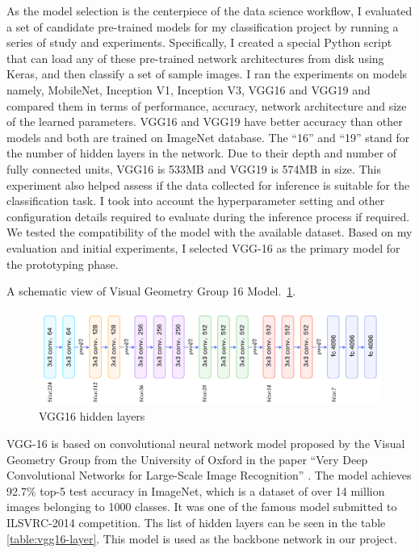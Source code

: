 As the model selection is the centerpiece of the data science workflow, I evaluated a set of candidate pre-trained models for my classification project by running a series of study and experiments. Specifically, I created a special Python script that can load any of these pre-trained network architectures from disk using Keras, and then classify a set of sample images. I ran the experiments on models namely, MobileNet, Inception V1, Inception V3, VGG16 and VGG19 and compared them in terms of performance, accuracy, network architecture and size of the learned parameters. VGG16 and VGG19 have better accuracy than other models and both are trained on ImageNet database. The “16” and “19” stand for the number of hidden layers in the network. Due to their depth and number of fully connected units, VGG16 is 533MB and VGG19 is 574MB in size. This experiment also helped assess if the data collected for inference is suitable for the classification task. I took into account the hyperparameter setting and other configuration details required to evaluate during the inference process if required. We tested the compatibility of the model with the available dataset. Based on my evaluation and initial experiments, I selected VGG-16 as the primary model for the prototyping phase.

A schematic view of Visual Geometry Group 16 Model.~\ref{fig:CNN-1}.
\begin{figure}[htbp]
\centering
\includegraphics[width=1\textwidth]{images/cnn-vgg16-1.png}
\caption{VGG16 hidden layers}
\label{fig:CNN-1}
\end{figure}

VGG-16 is based on convolutional neural network model proposed by the Visual Geometry Group from the University of Oxford in the paper “Very Deep Convolutional Networks for Large-Scale Image Recognition” \cite{2014arXiv1409.1556S}. The model achieves 92.7\% top-5 test accuracy in ImageNet, which is a dataset of over 14 million images belonging to 1000 classes. It was one of the famous model submitted to ILSVRC-2014 competition. Ths list of hidden layers can be seen in the table \ref{table:vgg16-layer}. This model is used as the backbone network in our project.

